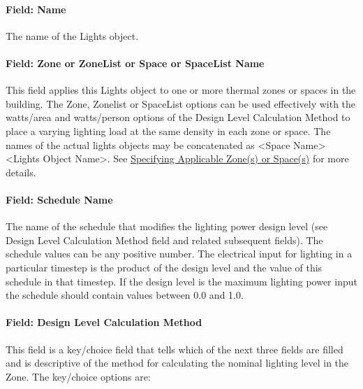 \paragraph{Field: Name}\label{field-name-2-020}

The name of the Lights object.

\paragraph{Field: Zone or ZoneList or Space or SpaceList Name}\label{lights-field-zone-or-zonelist-name-000}

This field applies this Lights object to one or more thermal zones or spaces in the building. The Zone, Zonelist or SpaceList options can be used effectively with the watts/area and watts/person options of the Design Level Calculation Method to place a varying lighting load at the same density in each zone or space. The names of the actual lights objects may be concatenated as \textless{}Space Name\textgreater{} \textless{}Lights Object Name\textgreater{}. See \hyperref[specifying-applicable-zones-or-spaces]{Specifying Applicable Zone(s) or Space(s)} for more details.

\paragraph{Field: Schedule Name}\label{field-schedule-name-002}

The name of the schedule that modifies the lighting power design level (see Design Level Calculation Method field and related subsequent fields). The schedule values can be any positive number. The electrical input for lighting in a particular timestep is the product of the design level and the value of this schedule in that timestep. If the design level is the maximum lighting power input the schedule should contain values between 0.0 and 1.0.

\paragraph{Field: Design Level Calculation Method}\label{field-design-level-calculation-method}

This field is a key/choice field that tells which of the next three fields are filled and is descriptive of the method for calculating the nominal lighting level in the Zone. The key/choice options are:

